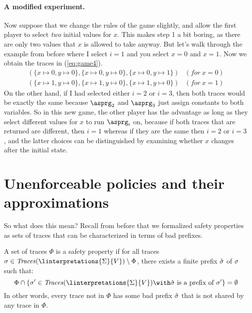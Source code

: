 \documentclass[11pt,twoside]{scrartcl}
\begin{document}
\paragraph{A modified experiment.} 
Now suppose that we change the rules of the game slightly, and allow the first player to select \emph{two} initial values for $x$. This makes step 1 a bit boring, as there are only two values that $x$ is allowed to take anyway. But let's walk through the example from before where I select $i=1$ and you select $x=0$ and $x=1$. Now we obtain the traces in (\ref{eq:game4}).
\begin{equation}
\label{eq:game4}
\begin{array}{ll}
(\{x \mapsto 0, y \mapsto 0\}, \{x \mapsto 0, y \mapsto 0\}, \{x \mapsto 0, y \mapsto 1\}) & \mathit{(for\ x = 0)}\\
(\{x \mapsto 1, y \mapsto 0\}, \{x \mapsto 1, y \mapsto 0\}, \{x \mapsto 1, y \mapsto 0\}) & \mathit{(for\ x = 1)}
\end{array}
\end{equation}
On the other hand, if I had selected either $i=2$ or $i=3$, then both traces would be exactly the same because $\asprg_2$ and $\asprg_3$ just assign constants to both variables. So in this new game, the other player has the advantage as long as they select different values for $x$ to run $\asprg_i$ on, because if both traces that are returned are different, then $i=1$ whereas if they are the same then $i=2$ or $i=3$, and the latter choices can be distinguished by examining whether $x$ changes after the initial state.

\section{Unenforceable policies and their approximations}

So what does this mean? Recall from before that we formalized safety properties as sets of traces that can be characterized in terms of bad prefixes.

\begin{definition}
\label{def:safety}
A set of traces $\Phi$ is a safety property if for all traces $\atrace \in  \ttraces{\linterpretations{\Sigma}{V}}\setminus\Phi$, there exists a finite prefix $\hat{\sigma}$ of $\sigma$ such that:
\[
\Phi \cap \{\atrace' \in  \ttraces{\linterpretations{\Sigma}{V}} \with \hat{\sigma}~\text{is a prefix of}~\atrace'\} = \emptyset
\]
In other words, every trace not in $\Phi$ has some bad prefix $\hat{\sigma}$ that is not shared by any trace in $\Phi$.
\end{definition}
\end{document}
